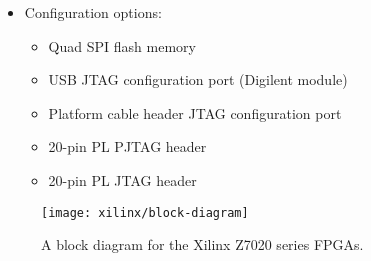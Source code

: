 \begin{itemize}
    \item Configuration options:
    \begin{itemize}
        \item Quad \gls{SPI} flash memory
        \item \gls{USB} \gls{JTAG} configuration port (Digilent module)
        \item Platform cable header \gls{JTAG} configuration port
        \item 20-pin \gls{PL} \gls{PJTAG} header
        \item 20-pin \gls{PL} \gls{JTAG} header
    \end{itemize}
\end{itemize}

\begin{figure}
    \centering
    \texttt{[image: xilinx/block-diagram]}
    \caption{A block diagram for the Xilinx Z7020 series \glspl{FPGA}.}
    \label{fig:zynq:blockDiagram}
\end{figure}

